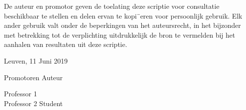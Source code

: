 \thispagestyle{empty}
\setlength{\parindent}{0cm}
\vspace*{\fill}
De auteur en promotor geven de toelating deze scriptie voor consultatie beschikbaar te stellen en delen ervan te kopi¨eren voor persoonlijk gebruik. Elk ander gebruik valt onder de beperkingen van het auteursrecht, in het bijzonder met betrekking tot de verplichting uitdrukkelijk de bron te vermelden bij het aanhalen van resultaten uit deze scriptie.\par
\vspace{0.4cm}
Leuven, 11 Juni 2019 \par
\vspace{0.5cm}
Promotoren \hfill Auteur \par 
\vspace{1cm}
Professor 1  \\
Professor 2 \hfill Student \\
\setlength{\parindent}{0.5cm}
